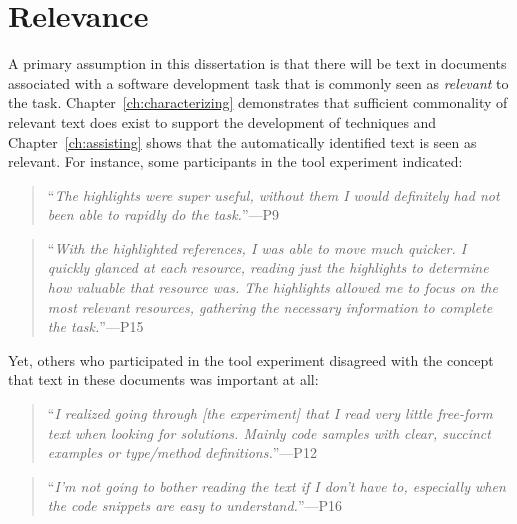 



\section{Relevance}
\label{cp7:relevance}

A primary assumption in this dissertation
is that there will be text in documents
associated with a software development
task that is commonly seen as \textit{relevant}
to the task. Chapter~\ref{ch:characterizing} demonstrates
that sufficient commonality of relevant
text does exist to support the development
of techniques and Chapter~\ref{ch:assisting} shows
that the automatically identified text
is seen as relevant. For instance,
some participants in the \acs{tool}
experiment indicated:

\smallskip
\begin{quote}
    ``\textit{The highlights were super useful, without them I would definitely had not been able to rapidly do the task.}''---P9
\end{quote}


\begin{quote}
``\textit{With the highlighted references, I was able to move much quicker. I quickly glanced at each resource, reading just the highlights to determine how valuable that resource was. The highlights allowed me to focus on the most relevant resources, gathering the necessary information to complete the task.}''---P15
\end{quote}

Yet, others who participated in the \acs{tool}
experiment disagreed with the concept that text
in these documents was important at all:





\smallskip
\begin{quote}
``\textit{I realized going through [the experiment] that I read very little free-form text when looking for solutions. Mainly code samples with clear, succinct examples or type/method definitions.}''---P12
\end{quote}

\begin{quote}
``\textit{I'm not going to bother reading the text if I don't have to, especially when the code snippets are easy to understand.}''---P16
\end{quote}




